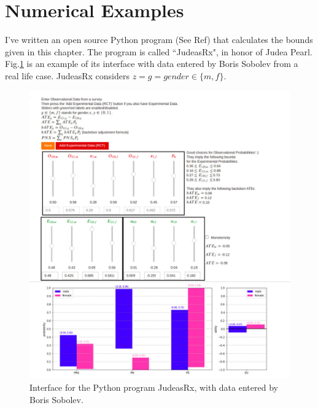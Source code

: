 \section{Numerical Examples}

I've written an open source Python program
(See Ref\cite{judeas-rx})
that calculates the
bounds given in this chapter. 
The program
is called ``JudeasRx", in honor of Judea
Pearl. 
Fig.\ref{fig-sobolev}
is an example of its interface
with data entered by Boris Sobolev
from a real life case.
JudeasRx considers
 $z=g=gender\in \{m,f\}$.

\begin{figure}[h!]
\centering
\includegraphics[width=5.5in]
{personalized/JudeasRx-screenshot.jpg}
\caption{Interface
for the Python
program JudeasRx,
with data entered 
by Boris Sobolev.} 
\label{fig-sobolev}
\end{figure}

